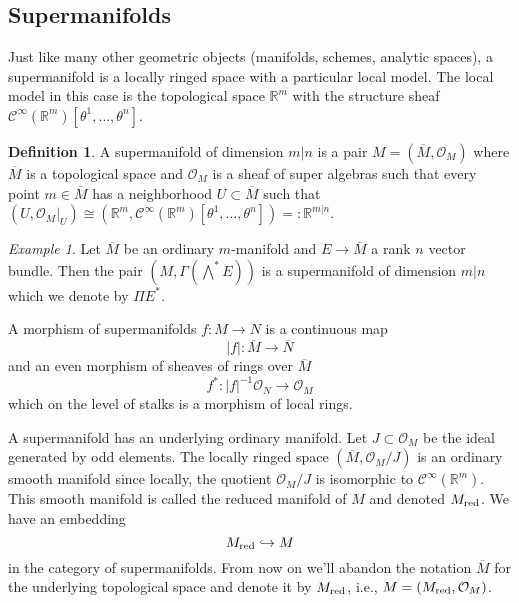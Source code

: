 \documentclass[11pt]{amsart}
\numberwithin{equation}{section}
\numberwithin{figure}{section}
\theoremstyle{plain}
\theoremstyle{definition}
\newtheorem{defn}[thm]{Definition}
\theoremstyle{remark}
\newtheorem{example}[thm]{Example}
\begin{document}
\subsection{Supermanifolds}

Just like many other geometric objects (manifolds, schemes, analytic
spaces), a supermanifold is a locally ringed space with a particular
local model. The local model in this case is the topological space
$\mathbb{R}^{m}$ with the structure sheaf $\mathcal{C}^{\infty}(\mathbb{R}^{m})[\theta^{1},\dots,\theta^{n}]$.
\begin{defn}
A supermanifold of dimension $m|n$ is a pair $M=(\overline{M},\mathcal{O}_{M})$
where $\overline{M}$ is a topological space and $\mathcal{O}_{M}$
is a sheaf of super algebras such that every point $m\in\overline{M}$
has a neighborhood $U\subset\overline{M}$ such that $(U,\mathcal{O}_{M}|_{U})\cong(\mathbb{R}^{m},\mathcal{C}^{\infty}(\mathbb{R}^{m})[\theta^{1},\dots,\theta^{n}])=:\mathbb{R}^{m|n}$.\end{defn}
\begin{example}
Let $\overline{M}$ be an ordinary $m$-manifold and $E\rightarrow\overline{M}$
a rank $n$ vector bundle. Then the pair $(M,\Gamma(\bigwedge^{*}E))$
is a supermanifold of dimension $m|n$ which we denote by $\Pi E^{*}$. 
\end{example}
A morphism of supermanifolds $f:M\rightarrow N$ is a continuous map
\[
|f|:\overline{M}\rightarrow\overline{N}
\]
and an even morphism of sheaves of rings over $\overline{M}$ 
\[
f^{*}:|f|^{-1}\mathcal{O}_{N}\rightarrow\mathcal{O}_{M}
\]
which on the level of stalks is a morphism of local rings. 

A supermanifold has an underlying ordinary manifold. Let $J\subset\mathcal{O}_{M}$
be the ideal generated by odd elements. The locally ringed space $(\overline{M},\mathcal{O}_{M}/J)$
is an ordinary smooth manifold since locally, the quotient $\mathcal{O}_{M}/J$
is isomorphic to $\mathcal{C}^{\infty}(\mathbb{R}^{m})$. This smooth
manifold is called the reduced manifold of $M$ and denoted $M_{\mathrm{red}}$.
We have an embedding 
\[
M_{\mathrm{red}}\hookrightarrow M
\]
in the category of supermanifolds. From now on we'll abandon the notation
$\overline{M}$ for the underlying topological space and denote it
by $M_{\mathrm{red}}$, i.e., $M=(M_{\mathrm{red}},\mathcal{O}_{M})$. 
\end{document}

